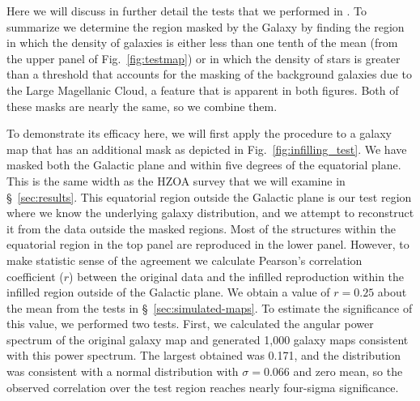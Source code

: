 \documentclass[useAMS,usenatbib]{mn2e}
\begin{document}
Here we will discuss in further detail the tests that we performed in
\citet{2016MNRAS.462.1085A}.  To summarize we determine the region
masked by the Galaxy by finding the region in which the density of
galaxies is either less than one tenth of the mean (from the upper
panel of Fig.~\ref{fig:testmap}) or in which the density of stars
\citep[from Fig.~2][]{2016MNRAS.462.1085A} is greater than a threshold
that accounts for the masking of the background galaxies due to the
Large Magellanic Cloud, a feature that is apparent in both figures.
Both of these masks are nearly the same, so we combine them.

To demonstrate its efficacy here, we will first apply the procedure to
a galaxy map that has an additional mask as depicted in
Fig.~\ref{fig:infilling_test}.  We have masked both the Galactic plane
and within five degrees of the equatorial plane. This is the same
width as the HZOA survey \citep{2016AJ....151...52S} that we will
examine in \S~\ref{sec:results}.  This equatorial region outside the
Galactic plane is our test region where we know the underlying galaxy
distribution, and we attempt to reconstruct it from the data outside
the masked regions.  Most of the structures within the equatorial
region in the top panel are reproduced in the lower panel.  However,
to make statistic sense of the agreement we calculate Pearson's
correlation coefficient ($r$) between the original data and the
infilled reproduction within the infilled region outside of the
Galactic plane.  We obtain a value of $r=0.25$ about the mean from the
tests in \S~\ref{sec:simulated-maps}.  To estimate the significance of
this value, we performed two tests.  First, we calculated the angular
power spectrum of the original galaxy map and generated 1,000 galaxy
maps consistent with this power spectrum.  The largest obtained was
0.171, and the distribution was consistent with a normal distribution
with $\sigma=0.066$ and zero mean, so the observed correlation over
the test region reaches nearly four-sigma significance.
\end{document}
